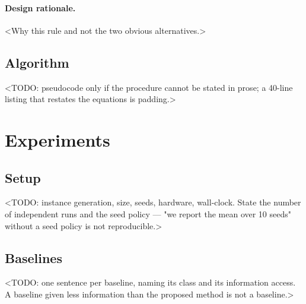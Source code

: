 \documentclass[10pt]{article}
\begin{document}
\paragraph{Design rationale.} <Why this rule and not the two obvious alternatives.>

\subsection{Algorithm}
<TODO: pseudocode only if the procedure cannot be stated in prose; a 40-line
listing that restates the equations is padding.>

\section{Experiments}
\label{sec:exp}
%

\subsection{Setup}
<TODO: instance generation, size, seeds, hardware, wall-clock. State the number of
independent runs and the seed policy — "we report the mean over 10 seeds" without
a seed policy is not reproducible.>

\subsection{Baselines}
<TODO: one sentence per baseline, naming its class and its information access. A
baseline given less information than the proposed method is not a baseline.>
\end{document}
